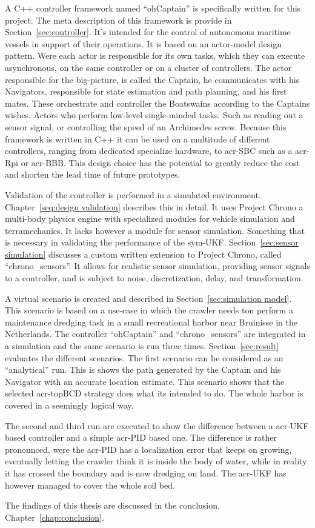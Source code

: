 A C++ controller framework named ``ohCaptain'' is specifically written for this project. The meta description of this
framework is provide in Section~\ref{sec:controller}. It's intended for the control of autonomous maritime vessels in
support of their operations. It is based on an actor-model design pattern. Were each actor is responsible for its own
tasks, which they can execute asynchronous, on the same controller or on a cluster of controllers. The actor
responsible for the big-picture, is called the Captain, he communicates with his Navigators, responsible for state
estimation and path planning, and his first mates. These orchestrate and controller the Boatswains according to the
Captains wishes. Actors who perform low-level single-minded tasks. Such as reading out a sensor signal, or controlling
the speed of an Archimedes screw. Because this framework is written in C++ it can be used on a multitude of different
controllers, ranging from dedicated specialize hardware, to \gls{acr-SBC} such as a \gls{acr-Rpi} or \gls{acr-BBB}.
This design choice has the potential to greatly reduce the cost and shorten the lead time of future prototypes.

Validation of the controller is performed in a simulated environment. Chapter~\ref{seq:design validation} describes
this in detail. It uses Project Chrono a multi-body physics engine with specialized modules for vehicle simulation
and terramechanics. It lacks however a module for sensor simulation. Something that is necessary in validating the
performance of the \gls{sym-UKF}. Section~\ref{sec:sensor simulation} discusses a custom written extension to Project
Chrono, called ``chrono\_sensors''. It allows for realistic sensor simulation, providing sensor signals to a
controller, and is subject to noise, discretization, delay, and transformation.

A virtual scenario is created and described in Section~\ref{sec:simulation model}. This scenario is based on a
use-case in which the crawler needs ton perform a maintenance dredging task in a small recreational harbor near
Bruinisse in the Netherlands. The controller ``ohCaptain'' and ``chrono\_sensors'' are integrated in a simulation
and the same scenario is run three times. Section~\ref{sec:result} evaluates the different scenarios. The first scenario
can be considered as an ``analytical'' run. This is shows the path generated by the Captain and his Navigator with an
accurate location estimate. This scenario shows that the selected \gls{acr-topBCD} strategy does what its intended to
do. The whole harbor is covered in a seemingly logical way.

The second and third run are executed to show the difference between a \gls{acr-UKF} based controller and a simple
\gls{acr-PID} based one. The difference is rather pronounced, were the \gls{acr-PID} has a localization error that
keeps on growing, eventually letting the crawler think it is inside the body of water, while in reality it has
crossed the boundary and is now dredging on land. The \gls{acr-UKF} has however managed to cover the whole soil bed.

\noindent The findings of this thesis are discussed in the conclusion, Chapter~\ref{chap:conclusion}.
